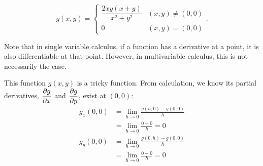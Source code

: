 \begin{example}
\[
    g(x, y) = \begin{cases} \dfrac{2xy(x+y)}{x^2+y^2} & (x,y) \neq (0,0) \\[10pt] 0 & (x,y) = (0,0) \end{cases}.
\]
\begin{center}
\def\funcG(#1,#2){ (#1 * sin(2*#2) * (cos(#2) + sin(#2))) }

\end{center}

Note that in single variable calculus, if a function has a derivative at a point, it is also differentiable at that point.
However, in multivariable calculus, this is not necessarily the case.

This function $g(x, y)$ is a tricky function.
From calculation, we know its partial derivatives, $\displaystyle\pdv{g}{x}$ and $\displaystyle\pdv{g}{y}$, exist at $(0, 0)$:
\begin{align*}
    g_x(0, 0) &= \lim_{h \to 0} \frac{g(h, 0) - g(0, 0)}{h} \\ 
              &= \lim_{h \to 0} \frac{0 - 0}{h} = 0 \\
    g_y(0, 0) &= \lim_{h \to 0} \frac{g(0, h) - g(0, 0)}{h} \\
              &= \lim_{h \to 0} \frac{0 - 0}{h} = 0
\end{align*}


\end{example}
